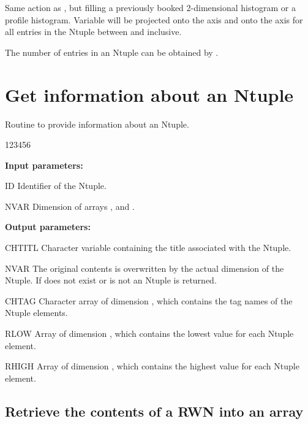 \Action
Same action as , but filling a previously
booked 2-dimensional histogram or a profile histogram.
Variable  will be projected onto the  axis and
 onto the  axis for all entries in the Ntuple
between  and  inclusive.
 
The number of entries in an Ntuple can be obtained by .
 
\newpage%

\section{Get information about an Ntuple}
 
 
\Action
Routine to provide information about an Ntuple.
 
\begin{DLtt}{123456}
\item[{\rm\bf Input parameters:}]
\item[ID] Identifier of the Ntuple.
\item[NVAR] Dimension of arrays , 
and .
\item[{\rm\bf Output parameters:}]
\item[CHTITL] Character
variable containing the title associated with the Ntuple.
\item[NVAR] The original contents is overwritten by the actual dimension of the Ntuple.
If  does not exist or is not an Ntuple  is returned.
\item[CHTAG] Character array of dimension , which
contains the tag names of the Ntuple elements.
\item[RLOW] Array of dimension , which
contains the lowest value for each Ntuple element.
\item[RHIGH] Array of dimension , which
contains the highest value for each Ntuple element.
\end{DLtt}
 
\subsection{Retrieve the contents of a RWN into an array}
 
 
